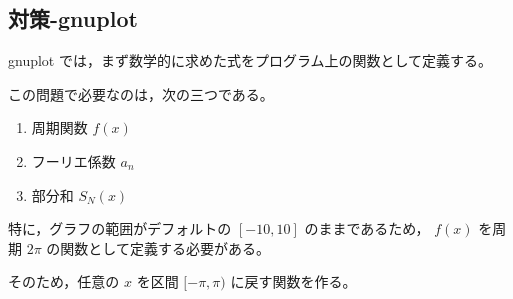 \usepackage{listing}
\subsection{対策-gnuplot}

\begin{background}
	gnuplot では，まず数学的に求めた式をプログラム上の関数として定義する。
	
	この問題で必要なのは，次の三つである。
	
	\begin{enumerate}
		\item 周期関数 \(f(x)\)
		\item フーリエ係数 \(a_n\)
		\item 部分和 \(S_N(x)\)
	\end{enumerate}
	
	特に，グラフの範囲がデフォルトの \([-10,10]\) のままであるため，
	\(f(x)\) を周期 \(2\pi\) の関数として定義する必要がある。
	
	そのため，任意の \(x\) を区間 \([-\pi,\pi)\) に戻す関数を作る。
\end{background}

